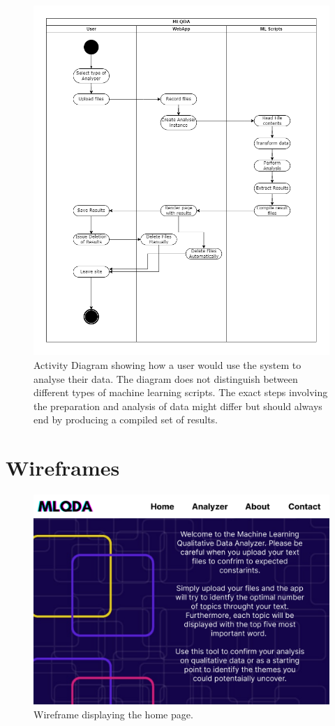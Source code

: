 \documentclass{l4proj}
\begin{document}
\begin{appendices}
\begin{figure}[H]
\centering
    \includegraphics[width=0.95\linewidth]{images/mlqda_activity.drawio.png}
    \caption{Activity Diagram showing how a user would use the system to analyse their data. The diagram does not distinguish between different types of machine learning scripts. The exact steps involving the preparation and analysis of data might differ but should always end by producing a compiled set of results.}
    \label{fig:mlqda_activity} 
\end{figure}


\chapter{Wireframes}
\label{appendix:wireframes}
\begin{figure}[H]
\centering
    \includegraphics[width=0.95\linewidth]{images/Home.png}
    \caption{Wireframe displaying the home page.}
    \label{fig:wireframes_home} 
\end{figure}


\end{appendices}
\end{document}
